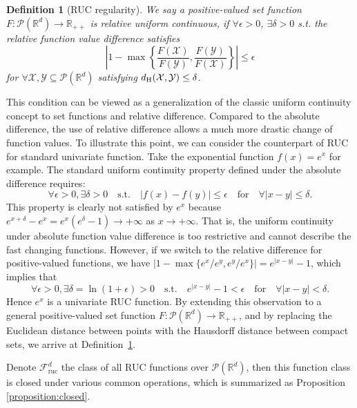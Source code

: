 \documentclass{article}
\newtheorem{definition}[theorem]{Definition}
\newcommand{\cX}{\mathcal{X}}
\newcommand{\cY}{\mathcal{Y}}
\newcommand{\cF}{\mathcal{F}}
\newcommand{\RR}{\mathbb{R}}
\begin{document}
\begin{definition}[RUC regularity]
\label{defn:RUC}
We say a positive-valued set function $F:\mathcal{P}(\mathbb{R}^d)\to\RR_{++}$ is relative uniform continuous, if $\forall\epsilon>0$, $\exists\delta >0$ s.t. the  relative function value difference satisfies  
$$\left|1-\max\left\{\frac{F(\cX)}{F(\cY)},\frac{F(\cY)}{F(\cX)}\right\}\right|\leq\epsilon
$$
for $\forall\cX,\cY\subseteq \mathcal{P}(\mathbb{R}^d)$ satisfying $d_{\rm H}(\cX,\cY)\leq \delta$.
\end{definition}
This condition can be viewed as a generalization of the classic uniform continuity concept to set functions and relative difference. Compared to the absolute difference, the use of relative difference allows a much more drastic change of function values. To illustrate this point, we can consider the counterpart of RUC for standard univariate function. Take the exponential function $f(x) = e^x$ for example. The standard uniform continuity property defined under the absolute difference requires:
$$\forall \epsilon>0, \exists \delta>0\quad \text{s.t.}\quad |f(x)-f(y)|\leq\epsilon\quad \text{for}\quad\forall |x-y|\leq \delta.$$
This property is clearly not satisfied by $e^x$ because $e^{x+\delta}-e^{x} = e^x(e^\delta-1)\to+\infty$ as $x\to+\infty$. 
That is, the uniform continuity under absolute function value difference is too restrictive and cannot describe the fast changing functions. However, if we switch to the relative difference for positive-valued functions, we have $|1-\max\{e^{x}/e^y,e^{y}/e^x\}| = e^{|x-y|}-1$, which implies that
$$\forall \epsilon>0, \exists \delta = \ln(1+\epsilon)>0 \quad\mbox{s.t.}\quad e^{|x-y|}-1<\epsilon\quad\mbox{for}\quad\forall |x-y|<\delta.$$
Hence $e^x$ is a univariate RUC function. By extending this observation to a general positive-valued set function 
$F:\mathcal{P}(\mathbb{R}^d)\to\mathbb{R}_{++}$, and by replacing the Euclidean 
distance between points with the Hausdorff distance between compact sets, we 
arrive at Definition~\ref{defn:RUC}.

Denote $\cF_{\text{ruc}}^d$ the class of all RUC functions over $\mathcal{P}(\RR^d)$, then this function class is closed under various common operations, which is summarized as Proposition \ref{proposition:closed}.
\end{document}
